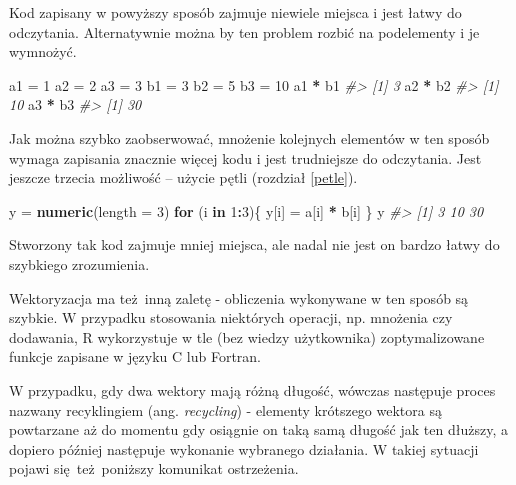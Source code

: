 \documentclass[paper=6in:9in,pagesize=pdftex,headinclude=on,footinclude=on,10pt]{scrbook}
\newenvironment{Shaded}{\begin{snugshade}}{\end{snugshade}}
\newcommand{\CommentTok}[1]{\textcolor[rgb]{0.56,0.35,0.01}{\textit{#1}}}
\newcommand{\ControlFlowTok}[1]{\textcolor[rgb]{0.13,0.29,0.53}{\textbf{#1}}}
\newcommand{\DataTypeTok}[1]{\textcolor[rgb]{0.13,0.29,0.53}{#1}}
\newcommand{\DecValTok}[1]{\textcolor[rgb]{0.00,0.00,0.81}{#1}}
\newcommand{\KeywordTok}[1]{\textcolor[rgb]{0.13,0.29,0.53}{\textbf{#1}}}
\newcommand{\NormalTok}[1]{#1}
\newcommand{\OperatorTok}[1]{\textcolor[rgb]{0.81,0.36,0.00}{\textbf{#1}}}
\newcommand{\StringTok}[1]{\textcolor[rgb]{0.31,0.60,0.02}{#1}}
\begin{document}
Kod zapisany w powyższy sposób zajmuje niewiele miejsca i jest łatwy do odczytania.
Alternatywnie można by ten problem rozbić na podelementy i je wymnożyć.

\begin{Shaded}
\begin{Highlighting}[]
\NormalTok{a1 =}\StringTok{ }\DecValTok{1}
\NormalTok{a2 =}\StringTok{ }\DecValTok{2}
\NormalTok{a3 =}\StringTok{ }\DecValTok{3}
\NormalTok{b1 =}\StringTok{ }\DecValTok{3}
\NormalTok{b2 =}\StringTok{ }\DecValTok{5}
\NormalTok{b3 =}\StringTok{ }\DecValTok{10}
\NormalTok{a1 }\OperatorTok{*}\StringTok{ }\NormalTok{b1}
\CommentTok{#> [1] 3}
\NormalTok{a2 }\OperatorTok{*}\StringTok{ }\NormalTok{b2}
\CommentTok{#> [1] 10}
\NormalTok{a3 }\OperatorTok{*}\StringTok{ }\NormalTok{b3}
\CommentTok{#> [1] 30}
\end{Highlighting}
\end{Shaded}

Jak można szybko zaobserwować, mnożenie kolejnych elementów w ten sposób wymaga zapisania znacznie więcej kodu i jest trudniejsze do odczytania.
Jest jeszcze trzecia możliwość -- użycie pętli (rozdział \ref{petle}).

\begin{Shaded}
\begin{Highlighting}[]
\NormalTok{y =}\StringTok{ }\KeywordTok{numeric}\NormalTok{(}\DataTypeTok{length =} \DecValTok{3}\NormalTok{)}
\ControlFlowTok{for}\NormalTok{ (i }\ControlFlowTok{in} \DecValTok{1}\OperatorTok{:}\DecValTok{3}\NormalTok{)\{}
\NormalTok{  y[i] =}\StringTok{ }\NormalTok{a[i] }\OperatorTok{*}\StringTok{ }\NormalTok{b[i]}
\NormalTok{\}}
\NormalTok{y}
\CommentTok{#> [1]  3 10 30}
\end{Highlighting}
\end{Shaded}

Stworzony tak kod zajmuje mniej miejsca, ale nadal nie jest on bardzo łatwy do szybkiego zrozumienia.

Wektoryzacja ma też~inną zaletę - obliczenia wykonywane w ten sposób są szybkie.
W przypadku stosowania niektórych operacji, np. mnożenia czy dodawania, R wykorzystuje w tle (bez wiedzy użytkownika) zoptymalizowane funkcje zapisane w języku C lub Fortran.

W przypadku, gdy dwa wektory mają różną długość, wówczas następuje proces nazwany recyklingiem (ang. \emph{recycling}) - elementy krótszego wektora są powtarzane aż do momentu gdy osiągnie on taką samą długość jak ten dłuższy, a dopiero później następuje wykonanie wybranego działania.
W takiej sytuacji pojawi się~też~poniższy komunikat ostrzeżenia.
\end{document}
